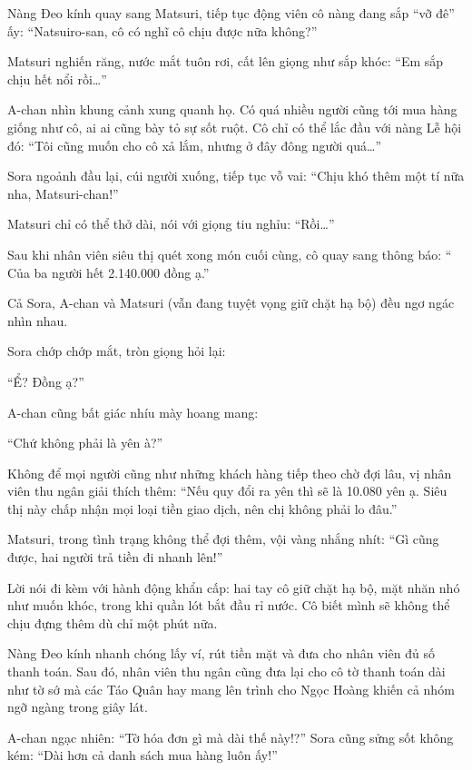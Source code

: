 \documentclass[../main.tex]{subfiles}
\begin{document}
Nàng Đeo kính quay sang Matsuri, tiếp tục động viên cô nàng đang sắp ``vỡ đê'' ấy: ``Natsuiro-san, cô có nghĩ cô chịu được nữa không?''

Matsuri nghiến răng, nước mắt tuôn rơi, cất lên giọng như sắp khóc: ``Em sắp chịu hết nổi rồi\dots''

A-chan nhìn khung cảnh xung quanh họ. Có quá nhiều người cũng tới mua hàng giống như cô, ai ai cũng bày tỏ sự sốt ruột. Cô chỉ có thể lắc đầu với nàng Lễ hội đó: ``Tôi cũng muốn cho cô xả lắm, nhưng ở đây đông người quá\dots''

Sora ngoảnh đầu lại, cúi người xuống, tiếp tục vỗ vai: ``Chịu khó thêm một tí nữa nha, Matsuri-chan!''

Matsuri chỉ có thể thở dài, nói với giọng tiu nghỉu: ``Rồi\dots''

\ct

Sau khi nhân viên siêu thị quét xong món cuối cùng, cô quay sang thông báo: ``{\color{red} Của ba người hết 2.140.000 đồng ạ.}''

Cả Sora, A-chan và Matsuri (vẫn đang tuyệt vọng giữ chặt hạ bộ) đều ngơ ngác nhìn nhau.

Sora chớp chớp mắt, tròn giọng hỏi lại:

{\color{red}``Ể? Đồng ạ?}''

A-chan cũng bất giác nhíu mày hoang mang:

{\color{red}``Chứ không phải là yên à?}''

Không để mọi người cũng như những khách hàng tiếp theo chờ đợi lâu, vị nhân viên thu ngân giải thích thêm: ``Nếu quy đổi ra yên thì sẽ là 10.080 yên ạ. Siêu thị này chấp nhận mọi loại tiền giao dịch, nên chị không phải lo đâu.''

Matsuri, trong tình trạng không thể đợi thêm, vội vàng nhắng nhít: ``Gì cũng được, hai người trả tiền đi nhanh lên!''

Lời nói đi kèm với hành động khẩn cấp: hai tay cô giữ chặt hạ bộ, mặt nhăn nhó như muốn khóc, trong khi quần lót bắt đầu rỉ nước. Cô biết mình sẽ không thể chịu đựng thêm dù chỉ một phút nữa.

Nàng Đeo kính nhanh chóng lấy ví, rút tiền mặt và đưa cho nhân viên đủ số thanh toán. Sau đó, nhân viên thu ngân cũng đưa lại cho cô tờ thanh toán dài như tờ sớ mà các Táo Quân hay mang lên trình cho Ngọc Hoàng khiến cả nhóm ngỡ ngàng trong giây lát.

A-chan ngạc nhiên: ``Tờ hóa đơn gì mà dài thế này!?'' Sora cũng sửng sốt không kém: ``Dài hơn cả danh sách mua hàng luôn ấy!''
\end{document}
